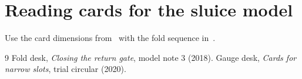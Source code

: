 \documentclass{article}
\begin{document}
\section*{Reading cards for the sluice model}

Use the card dimensions from~\cite{cards} with the fold sequence in~\cite{fold}.
\begin{thebibliography}{9}
Fold desk, \emph{Closing the return gate}, model note 3 (2018).
Gauge desk, \emph{Cards for narrow slots}, trial circular (2020).
\end{thebibliography}
\end{document}
